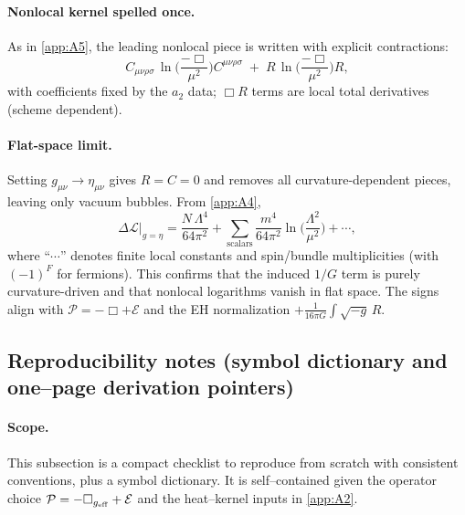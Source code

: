 \documentclass{iopjournal}
\begin{document}
\paragraph{Nonlocal kernel spelled once.}
As in  \cref{app:A5}, the leading nonlocal piece is written with explicit contractions:
\[
C_{\mu\nu\rho\sigma}\,\ln\!\Big(\frac{-\Box}{\mu^2}\Big)C^{\mu\nu\rho\sigma}
\;+\;
R\,\ln\!\Big(\frac{-\Box}{\mu^2}\Big)R,
\]
with coefficients fixed by the \(a_2\) data; \(\Box R\) terms are local total derivatives (scheme dependent).

\paragraph{Flat-space limit.}
Setting \(g_{\mu\nu}\!\to\!\eta_{\mu\nu}\) gives \(R=C=0\) and removes all curvature-dependent pieces, leaving only vacuum bubbles. From \cref{app:A4},
\begin{equation}
\Delta\mathcal{L}\big|_{g=\eta}
=\frac{N\,\Lambda^4}{64\pi^2}
+\sum_{\text{scalars}}\frac{m^4}{64\pi^2}\ln\!\Big(\frac{\Lambda^2}{\mu^2}\Big)
+\cdots,
\label{eq:A6_flat}
\end{equation}
where ``\(\cdots\)'' denotes finite local constants and spin/bundle multiplicities (with \((-1)^F\) for fermions). This confirms that the induced \(1/G\) term is purely curvature-driven and that nonlocal logarithms vanish in flat space. The signs align with \(\mathcal{P}=-\Box+\mathcal{E}\) and the EH normalization \(+\frac{1}{16\pi G}\!\int\!\sqrt{-g}\,R\).


\subsection{Reproducibility notes (symbol dictionary and one–page derivation pointers)}\label{app:A7}
\paragraph{Scope.}
This subsection is a compact checklist to reproduce  from scratch with consistent conventions, plus a symbol dictionary. It is self–contained given the operator choice $\mathcal{P}=-\Box_{g_{\rm eff}}+\mathcal{E}$ and the heat–kernel inputs in \cref{app:A2}.
\end{document}

